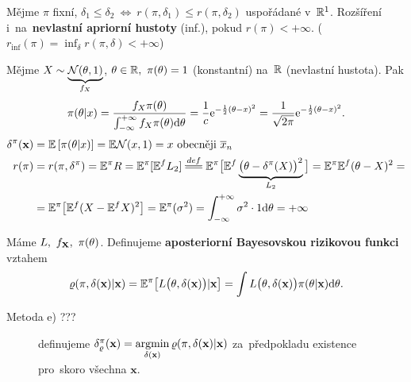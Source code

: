 \begin{remark}
	Mějme $\pi$ fixní, $\delta_1\leq\delta_2~\Leftrightarrow~r(\pi,\delta_1)\leq r(\pi,\delta_2)$ uspořádané v~$\mathbb{R}^1$. Rozšíření i~na~\textbf{nevlastní apriorní hustoty} (inf.), pokud $r(\pi)<+\infty$. ($r_\text{inf}(\pi)=\inf_\delta r(\pi,\delta)<+\infty$)
\end{remark}
\begin{example}
	Mějme $X\sim\underbrace{\mathcal{N}(\theta,1)}_{f_X}$, $\theta\in\mathbb{R},~\pi(\theta)=1$ (konstantní) na~$\mathbb{R}$ (nevlastní hustota). Pak
	$$ \pi(\theta|x)=\frac{f_X \pi(\theta)}{\int_{-\infty}^{+\infty}f_X \pi(\theta)\mathrm{d}\theta}=\frac{1}{c}\mathrm{e}^{-\frac{1}{2}(\theta-x)^2}=\frac{1}{\sqrt{2\pi}}\mathrm{e}^{-\frac{1}{2}(\theta-x)^2}.$$
	\[\begin{split}
	\delta^\pi(\textbf{x})&=\EE{\pi(\t|x)}=\E\NN(x,1)=x\text{ obecněji }\overline{x}_n\\
	r(\pi)&= r(\pi,\delta^\pi)=\E^\pi R=\E^\pi[\E^f L_2]\equal{def}\E^\pi\big[ \E^f\underbrace{\big(\t-\delta^\pi(X) \big)^2}_{L_2} \big]=\E^\pi\E^f(\t-X)^2=\\&=\E^\pi\big[ \E^f(X-\E^fX)^2 \big]=\E^\pi(\sigma^2)=\int_{-\infty}^{+\infty}\sigma^2\cdot 1\d\t=+\infty
	\end{split}
	\]
\end{example}
\begin{define}
	Máme $L,~f_{\textbf{X}},~\pi(\theta)$. Definujeme \textbf{aposteriorní Bayesovskou rizikovou funkci} vztahem
	$$ \varrho(\pi,\delta(\textbf{x})|\textbf{x})=\mathbb{E}^\pi\big[ L\big(\theta,\delta(\textbf{x})\big)|\textbf{x} \big]=\int L\big(\theta,\delta(\textbf{x})\big)\pi(\theta|\textbf{x})\mathrm{d}\theta.$$ 
\end{define}

\begin{description}
	\item[Metoda e) ???] definujeme $\delta_\varrho^\pi(\textbf{x})=\mathop{\mathrm{argmin}}\limits_{\delta(\textbf{x})}\varrho(\pi,\delta(\textbf{x})|\textbf{x})$ za~předpokladu existence pro~skoro všechna $\textbf{x}$.
\end{description}


